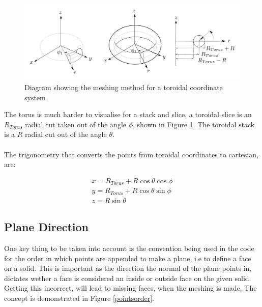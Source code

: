 \documentclass[12pt,a4paper]{article}
\begin{document}
\begin{figure}[h!]
\centering
\includegraphics[scale=0.35]{Images//Coords/torus_coords.png}
\caption[width=\columnwidth]{Diagram showing the meshing method for a toroidal coordinate system}
\label{tormeshin}
\end{figure}

The torus is much harder to visualise for a stack and slice, a toroidal slice is an $R_{Torus}$ radial cut taken out of the angle $\phi$, shown in Figure \ref{tormeshin}. The toroidal stack is a $R$ radial cut out of the angle $\theta$. 
\\\\
The trigonometry that converts the points from toroidal coordinates to cartesian, are:

\begin{equation}
\begin{split}
x = R_{Torus} + R\cos{\theta}\cos{\phi} \\
y = R_{Torus} + R\cos{\theta}\sin{\phi} \\
z =  R\sin{\theta} 
\end{split}
\end{equation}

\subsection{Plane Direction}
One key thing to be taken into account is the convention being used in the code for the order in which points are appended to make a plane, i.e to define a face on a solid. This is important as the direction the normal of the plane points in, dictates wether a face is considered an inside or outside face on the given solid. Getting this incorrect, will lead to missing faces, when the meshing is made. The concept is demonstrated in Figure \ref{pointsorder}.
\end{document}
